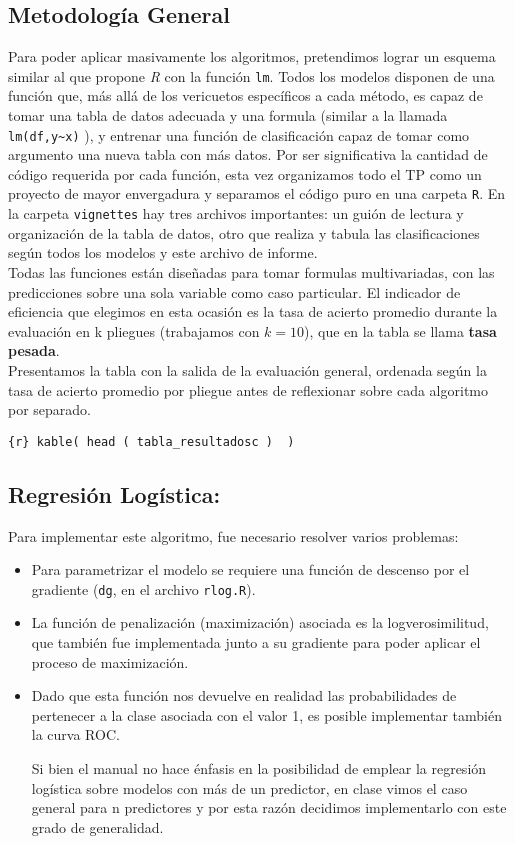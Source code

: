 \documentclass[]{article}
\begin{document}
\hypertarget{metodologia-general}{%
\subsection{Metodología General}\label{metodologia-general}}

Para poder aplicar masivamente los algoritmos, pretendimos lograr un
esquema similar al que propone \emph{R} con la función \texttt{lm}.
Todos los modelos disponen de una función que, más allá de los
vericuetos específicos a cada método, es capaz de tomar una tabla de
datos adecuada y una formula (similar a la llamada
\texttt{lm(df,y\textasciitilde{}x)} ), y entrenar una función de
clasificación capaz de tomar como argumento una nueva tabla con más
datos. Por ser significativa la cantidad de código requerida por cada
función, esta vez organizamos todo el TP como un proyecto de mayor
envergadura y separamos el código puro en una carpeta \texttt{R}. En la
carpeta \texttt{vignettes} hay tres archivos importantes: un guión de
lectura y organización de la tabla de datos, otro que realiza y tabula
las clasificaciones según todos los modelos y este archivo de informe.\\
Todas las funciones están diseñadas para tomar formulas multivariadas,
con las predicciones sobre una sola variable como caso particular. El
indicador de eficiencia que elegimos en esta ocasión es la tasa de
acierto promedio durante la evaluación en k pliegues (trabajamos con
\(k=10\)), que en la tabla se llama \textbf{tasa pesada}.\\
Presentamos la tabla con la salida de la evaluación general, ordenada
según la tasa de acierto promedio por pliegue antes de reflexionar sobre
cada algoritmo por separado.

\texttt{\{r\}\ kable(\ head\ (\ tabla\_resultadosc\ )\ \ )}

\hypertarget{regresion-logistica}{%
\subsection{Regresión Logística:}\label{regresion-logistica}}

Para implementar este algoritmo, fue necesario resolver varios
problemas:

\begin{itemize}
\item
  Para parametrizar el modelo se requiere una función de descenso por el
  gradiente (\texttt{dg}, en el archivo \texttt{rlog.R}).
\item
  La función de penalización (maximización) asociada es la
  logverosimilitud, que también fue implementada junto a su gradiente
  para poder aplicar el proceso de maximización.
\item
  Dado que esta función nos devuelve en realidad las probabilidades de
  pertenecer a la clase asociada con el valor 1, es posible implementar
  también la curva ROC.

  Si bien el manual no hace énfasis en la posibilidad de emplear la
  regresión logística sobre modelos con más de un predictor, en clase
  vimos el caso general para n predictores y por esta razón decidimos
  implementarlo con este grado de generalidad.
\end{itemize}
\end{document}
